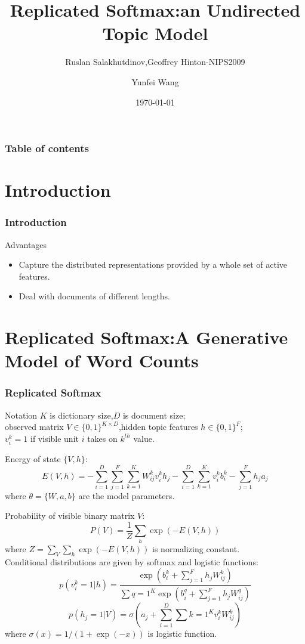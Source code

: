 \documentclass{beamer}
\title{Replicated Softmax:an Undirected Topic Model}
\subtitle{Ruslan Salakhutdinov,Geoffrey Hinton-NIPS2009}
\author{Yunfei Wang}
\institute{Department of Computer Science \& Technology \\ Huazhong University of Science \& Technology}
\date{\today}
\begin{document}
\begin{CJK*}{UTF8}{gbsn} %

\begin{frame}
\titlepage
\end{frame}

\begin{frame}\frametitle{Table of contents}
\tableofcontents
\end{frame}

\section{Introduction}
\begin{frame}\frametitle{Introduction}
\begin{block}{Advantages}
\begin{itemize}
\item Capture the distributed representations provided by a whole set of active features.
\item Deal with documents of different lengths.
\end{itemize}
\end{block}
\end{frame}

\section{Replicated Softmax:A Generative Model of Word Counts}
\begin{frame}[allowframebreaks]\frametitle{Replicated Softmax}
\begin{block}{Notation}
$K$ is dictionary size,$D$ is document size;\\
observed matrix $V\in\{0,1\}^{K\times D}$,hidden topic features $h\in\{0,1\}^F$;\\
$v_i^k=1$ if visible unit $i$ takes on $k^{th}$ value.
\end{block}
Energy of state $\{V,h\}$:
\begin{equation}
E(V,h)=-\sum_{i=1}^D\sum_{j=1}^F\sum_{k=1}^KW_{ij}^kv_i^kh_j-\sum_{i=1}^D\sum_{k=1}^Kv_i^kb_i^k-\sum_{j=1}^Fh_ja_j
\end{equation}
where $\theta=\{W,a,b\}$ are the model parameters.

\newpage
Probability of visible binary matrix $V$:
\begin{equation}
P(V)=\frac{1}{Z}\sum_h\exp(-E(V,h))
\end{equation}
where $Z=\sum_V\sum_h\exp(-E(V,h))$ is normalizing constant.\\
Conditional distributions are given by softmax and logistic functions:
\begin{equation}
p(v_i^k=1|h)=\frac{\exp(b_i^k+\sum_{j=1}^Fh_jW_{ij}^k)}{\sum{q=1}^K\exp(b_i^q+\sum_{j=1}^Fh_jW_{ij}^q)}
\end{equation}
\begin{equation}
p(h_j=1|V)=\sigma(a_j+\sum_{i=1}^D\sum{k=1}^Kv_i^kW_{ij}^k)
\end{equation}
where $\sigma(x)=1/(1+\exp(-x))$ is logistic function.


\end{frame}
\end{CJK*}
\end{document}
